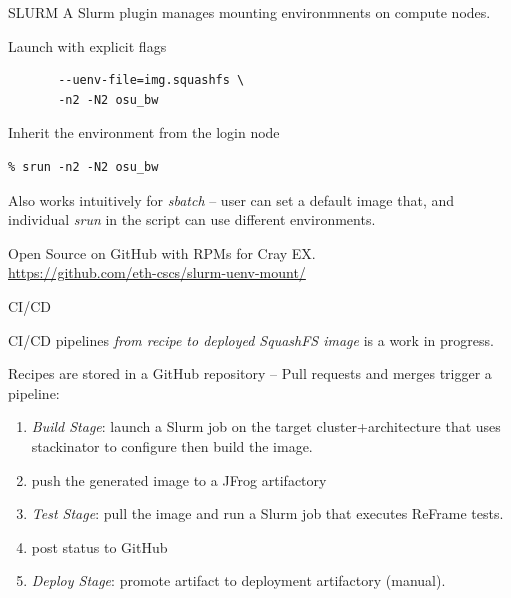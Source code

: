 \documentclass[aspectratio=43]{beamer}
\begin{document}
\begin{frame}[fragile]{SLURM}
    A Slurm plugin manages mounting environmnents on compute nodes.
    \begin{code}{Launch with explicit flags}
            \begin{lstlisting}[style=talkbash]
% srun --uenv-mount=/user-environment \
       --uenv-file=img.squashfs \
       -n2 -N2 osu_bw
            \end{lstlisting}
    \end{code}
    \begin{code}{Inherit the environment from the login node}
            \begin{lstlisting}[style=talkbash]
% squashfs-mount img.squashfs /user-environment bash
% srun -n2 -N2 osu_bw
            \end{lstlisting}
    \end{code}

    Also works intuitively for \emph{sbatch} -- user can set a default image that, and individual \emph{srun} in the script can use different environments.

    Open Source on GitHub with RPMs for Cray EX.\\\url{https://github.com/eth-cscs/slurm-uenv-mount/}
\end{frame}

\begin{frame}[fragile]{CI/CD}
    \begin{center}
    CI/CD pipelines \emph{from recipe to deployed SquashFS image} is a work in progress.
    \end{center}

    \vspace{10pt}

    Recipes are stored in a GitHub repository -- Pull requests and merges trigger a pipeline:
    \begin{enumerate}
        \item \emph{\sc Build Stage}: launch a Slurm job on the target cluster+architecture that uses stackinator to configure then build the image.
        \item push the generated image to a JFrog artifactory
        \item \emph{\sc Test Stage}: pull the image and run a Slurm job that executes ReFrame tests.
        \item post status to GitHub
        \item \emph{\sc Deploy Stage}: promote artifact to deployment artifactory (manual).
    \end{enumerate}
\end{frame}
\end{document}
